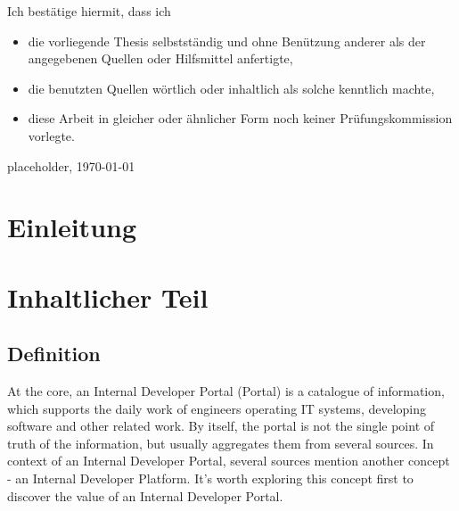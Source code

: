 \documentclass[a4paper,12pt]{article}
\begin{document}
    Ich bestätige hiermit, dass ich
    \begin{itemize}
        \item die vorliegende Thesis selbstständig und ohne Benützung anderer als der angegebenen Quellen oder Hilfsmittel anfertigte,
        \item die benutzten Quellen wörtlich oder inhaltlich als solche kenntlich machte,
        \item diese Arbeit in gleicher oder ähnlicher Form noch keiner Prüfungskommission vorlegte.
    \end{itemize}
    placeholder, \today\newline


    \section{Einleitung}


    \section{Inhaltlicher Teil}

    \subsection{Definition}
    At the core, an Internal Developer Portal (Portal) is a catalogue of information, which supports the daily work of
    engineers operating IT systems, developing software and other related work.
    By itself, the portal is not the single point of truth of the information, but usually aggregates them from several sources.
    In context of an Internal Developer Portal, several sources mention another concept - an Internal Developer Platform.
    It's worth exploring this concept first to discover the value of an Internal Developer Portal.
\end{document}
